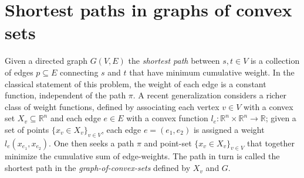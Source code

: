 \documentclass[letterpaper, 11pt]{article}
\begin{document}
%


\section{Shortest paths in graphs of convex sets}
Given a directed graph $G(V, E)$ the \emph{shortest path} between $s, t \in V$
is a collection of edges $p \subseteq E$ connecting $s$ and $t$ that have minimum cumulative weight.
In the classical statement of this problem, the weight
of each edge is a constant function, independent of the path $\pi$. 
A recent generalization considers a richer class of weight functions,
defined by associating each vertex $v \in V$ with a convex set $X_v \subseteq \mathbb{R}^n$ 
and each  edge $e \in E$ with a convex function 
$l_e : \mathbb{R}^n \times \mathbb{R}^n \rightarrow \mathbb{R}$;
given a set of points $\{x_v \in X_v\}_{v \in V}$, each edge $e = (e_1, e_2)$ is assigned a weight $l_e(x_{e_1}, x_{e_2})$.
One then seeks a path $\pi$ and point-set $\{x_v \in X_v\}_{v \in V}$ that together minimize the cumulative sum of edge-weights.
The path in turn is called the shortest path in the \emph{graph-of-convex-sets} 
defined by $X_v$ and $G$.
\end{document}
